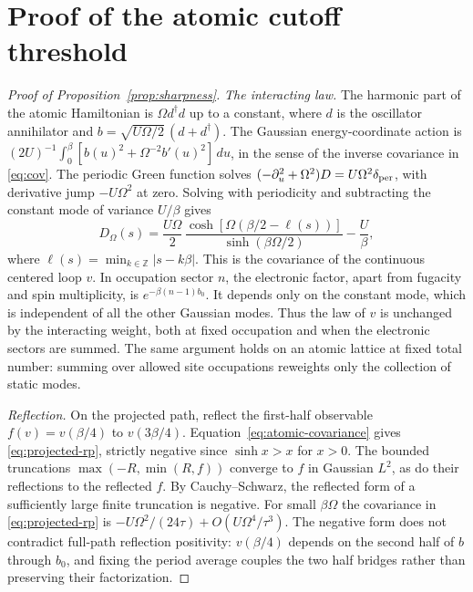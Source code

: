 \documentclass[11pt]{article}
\begin{document}
\section{Proof of the atomic cutoff threshold}\label{app:sharpness}
\begin{proof}[Proof of Proposition~\ref{prop:sharpness}]
\emph{The interacting law.}
The harmonic part of the atomic Hamiltonian is $\Omega d^\dagger d$ up to a constant, where $d$ is the oscillator annihilator and $b=\sqrt{U\Omega/2}\,(d+d^\dagger)$. The Gaussian energy-coordinate action is $(2U)^{-1}\int_0^\beta[b(u)^2+\Omega^{-2}b'(u)^2]\,du$, in the sense of the inverse covariance in \eqref{eq:cov}. The periodic Green function solves $(-\partial_u^2+\Omega^2)D=U\Omega^2\delta_{\rm per}$, with derivative jump $-U\Omega^2$ at zero. Solving with periodicity and subtracting the constant mode of variance $U/\beta$ gives
\begin{equation}\label{eq:atomic-covariance}
 D_\Omega(s)=\frac{U\Omega}{2}\,
 \frac{\cosh[\Omega(\beta/2-\ell(s))]}{\sinh(\beta\Omega/2)}
 -\frac{U}{\beta},
\end{equation}
where $\ell(s)=\min_{k\in\mathbb Z}|s-k\beta|$. This is the covariance of the continuous centered loop $v$. In occupation sector $n$, the electronic factor, apart from fugacity and spin multiplicity, is $e^{-\beta(n-1)b_0}$. It depends only on the constant mode, which is independent of all the other Gaussian modes. Thus the law of $v$ is unchanged by the interacting weight, both at fixed occupation and when the electronic sectors are summed. The same argument holds on an atomic lattice at fixed total number: summing over allowed site occupations reweights only the collection of static modes.

\emph{Reflection.}
On the projected path, reflect the first-half observable $f(v)=v(\beta/4)$ to $v(3\beta/4)$. Equation~\eqref{eq:atomic-covariance} gives \eqref{eq:projected-rp}, strictly negative since $\sinh x>x$ for $x>0$. The bounded truncations $\max(-R,\min(R,f))$ converge to $f$ in Gaussian $L^2$, as do their reflections to the reflected $f$. By Cauchy--Schwarz, the reflected form of a sufficiently large finite truncation is negative. For small $\beta\Omega$ the covariance in \eqref{eq:projected-rp} is $-U\Omega^2/(24\tau)+O(U\Omega^4/\tau^3)$. The negative form does not contradict full-path reflection positivity: $v(\beta/4)$ depends on the second half of $b$ through $b_0$, and fixing the period average couples the two half bridges rather than preserving their factorization.


\end{proof}
\end{document}
